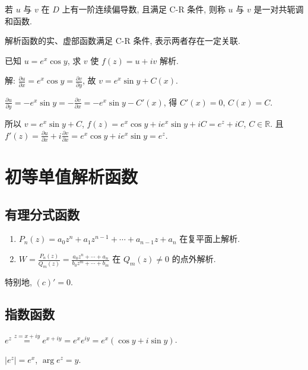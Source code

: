 \documentclass[theorem=false,mathfont=none,openany,sub3section]{easybook}
\begin{document}
\begin{definition}
  若 $u$ 与 $v$ 在 $D$ 上有一阶连续偏导数, 且满足 C-R 条件, 则称 $u$ 与 $v$ 是一对共轭调和函数.
\end{definition}

\begin{remark}
  解析函数的实、虚部函数满足 C-R 条件, 表示两者存在一定关联.
\end{remark}

\begin{example}
  已知 $u=e^{x}\cos y$, 求 $v$ 使 $f(z)=u+iv$ 解析.\par
  解: $\frac{\partial u}{\partial x}=e^{x}\cos y=\frac{\partial v}{\partial y}$, 故 $v=e^{x}\sin y+C(x)$.\par
  $\frac{\partial u}{\partial y}=-e^{x}\sin y=-\frac{\partial v}{\partial x}=-e^{x}\sin y-C'(x)$, 得 $C'(x)=0$, $C(x)=C$.\par
  所以 $v=e^{x}\sin y+C$, $f(z)=e^{x}\cos y+ie^{x}\sin y+iC=e^{z}+iC$, $C\in\mathbb{R}$.
  且 $f'(z)=\frac{\partial u}{\partial x}+i\frac{\partial v}{\partial x}=e^{x}\cos y+ie^{x}\sin y=e^{z}$.
\end{example}

\newpage

\section{初等单值解析函数}

\subsection{有理分式函数}

\begin{enumerate}
  \item $P_{n}(z)=a_{0}z^{n}+a_{1}z^{n-1}+\cdots+a_{n-1}z+a_{n}$ 在复平面上解析.
  \item $W=\frac{P_{n}(z)}{Q_{m}(z)}=\frac{a_{0}z^{n}+\cdots+a_{n}}{b_{0}z^{m}+\cdots+b_{m}}$ 在 $Q_{m}(z)\neq0$ 的点外解析.
\end{enumerate}
特别地, $(c)'=0$.

\subsection{指数函数}

\begin{definition}
  $e^{z}\stackrel{z=x+iy}{=}e^{x+iy}=e^{x}e^{iy}=e^{x}(\cos y+i\sin y)$.\par
  $|e^{z}|=e^{x}$, $\arg e^{z}=y$.
\end{definition}
\end{document}
